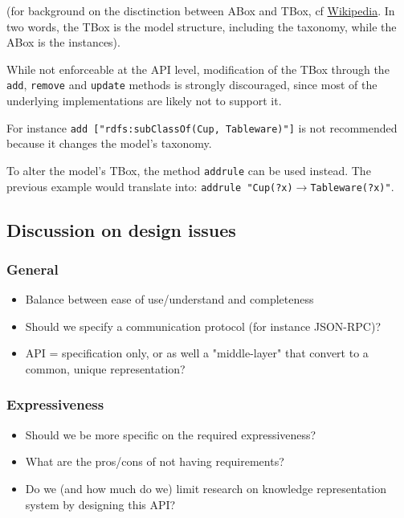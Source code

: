 (for background on the disctinction between ABox and TBox, cf \href{http://en.wikipedia.org/wiki/Description_logic\#Modeling}{ Wikipedia}. In two words, the TBox is the model structure, including the taxonomy, while the ABox is the instances).

While not enforceable at the API level, modification of the TBox through the \texttt{add}, \texttt{remove} and \texttt{update} methods is strongly discouraged, since most of the underlying implementations are likely not to support it.

For instance \texttt{add ["rdfs:subClassOf(Cup, Tableware)"]} is not recommended because it changes the model's taxonomy.

To alter the model's TBox, the method \texttt{addrule} can be used instead. The previous example would translate into: \texttt{addrule "Cup(?x){$\rightarrow$}Tableware(?x)"}.


\subsection{Discussion on design issues}


\subsubsection{General}


\begin{itemize}
\item  Balance between ease of use/understand and completeness
\item  Should we specify a communication protocol (for instance JSON-RPC)?
\item  API = specification only, or as well a "middle-layer" that convert to a common, unique representation?
\end{itemize}

\subsubsection{Expressiveness}


\begin{itemize}
\item  Should we be more specific on the required expressiveness?
\item  What are the pros/cons of not having requirements?
\item  Do we (and how much do we) limit research on knowledge representation system by designing this API?
\end{itemize}

